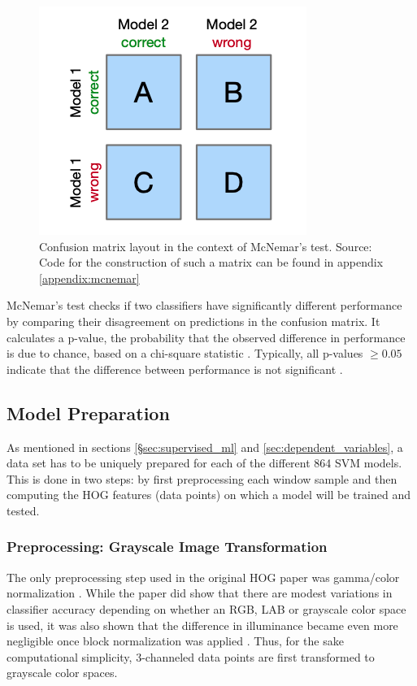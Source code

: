     \begin{figure}
        \centering
        \includegraphics[width=0.5\linewidth]{images/mcnemar_matrix.png}
        \caption{Confusion matrix layout in the context of McNemar's test. Source: \cite{raschka_2018_mcnemar} Code for the construction of such a matrix can be found in appendix \ref{appendix:mcnemar}}
        \label{fig:confusion_mcnemar}
    \end{figure}

    McNemar's test checks if two classifiers have significantly different performance by comparing their disagreement on predictions in the confusion matrix. It calculates a p-value, the probability that the observed difference in performance is due to chance, based on a chi-square statistic \cite{dietterich_1998_mcnemar}. Typically, all p-values $\ge 0.05$ indicate that the difference between performance is not significant \cite{raschka_2018_mcnemar} \cite{dietterich_1998_mcnemar}. 


    \subsection{Model Preparation}

    As mentioned in sections \ref{§sec:supervised_ml} and \ref{sec:dependent_variables}, a data set has to be uniquely prepared for each of the different 864 SVM models. This is done in two steps: by first preprocessing each window sample and then computing the HOG features (data points) on which a model will be trained and tested.

    \subsubsection{Preprocessing: Grayscale Image Transformation}

    The only preprocessing step used in the original HOG paper was gamma/color normalization \cite{dalal_2005_histograms}. While the paper did show that there are modest variations in classifier accuracy depending on whether an RGB, LAB or grayscale color space is used, it was also shown that the difference in illuminance became even more negligible once block normalization was applied \cite{dalal_2005_histograms}. Thus, for the sake computational simplicity, 3-channeled data points are first transformed to grayscale color spaces.


